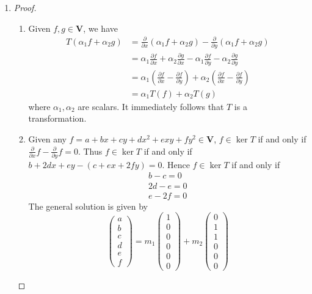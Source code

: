 \begin{enumerate}
\begin{proof}[Solution.]
\end{proof}
\item\begin{proof}
\begin{enumerate}
\item
Given $f,g\in\bm V$, we have
\[
\begin{aligned}
T(\alpha_1f+\alpha_2g)&=\frac{\partial }{\partial x}(\alpha_1f+\alpha_2g)-\frac{\partial}{\partial y}(\alpha_1f+\alpha_2g)\\
                      &=\alpha_1\frac{\partial f}{\partial x}+\alpha_2\frac{\partial g}{\partial x}-\alpha_1\frac{\partial f}{\partial y}-\alpha_2\frac{\partial g}{\partial y}\\
                      &=\alpha_1(\frac{\partial f}{\partial x}-\frac{\partial f}{\partial y})+\alpha_2(\frac{\partial f}{\partial x}-\frac{\partial f}{\partial y})\\
                      &=\alpha_1T(f)+\alpha_2T(g)
\end{aligned}
\]
where $\alpha_1,\alpha_2$ are scalars. It immediately follows that $T$ is a transformation.
\item
Given any $f=a+bx+cy+dx^2+exy+fy^2\in\bm V$, $f\in\ker T$ if and only if $\frac{\partial}{\partial x}f-\frac{\partial}{\partial y}f=0$. Thus $f\in\ker T$ if and only if $b+2dx+ey-(c+ex+2fy)=0$. Hence $f\in\ker T$ if and only if
\begin{gather*}
b-c=0\\2d-e=0\\e-2f=0
\end{gather*}
The general solution is given by
\[
\begin{pmatrix}
a\\b\\c\\d\\e\\f
\end{pmatrix}=m_1\begin{pmatrix}
1\\0\\0\\0\\0\\0
\end{pmatrix}+m_2\begin{pmatrix}
0\\1\\1\\0\\0\\0

\end{pmatrix}\]
\end{enumerate}
\end{proof}
\end{enumerate}
